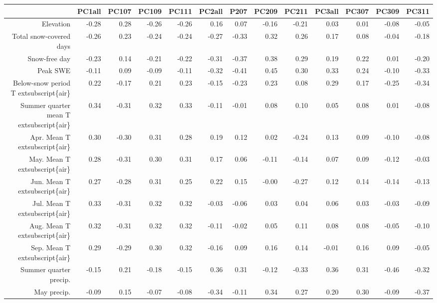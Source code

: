 \begin{table}[ht]
\centering
\begin{tabular}{rrrrrrrrrrrrr}
  \hline
 & PC1all & PC107 & PC109 & PC111 & PC2all & P207 & PC209 & PC211 & PC3all & PC307 & PC309 & PC311 \\ 
  \hline
Elevation & -0.28 & 0.28 & -0.26 & -0.26 & 0.16 & 0.07 & -0.16 & -0.21 & 0.03 & 0.01 & -0.08 & -0.05 \\ 
  Total snow-covered days & -0.26 & 0.23 & -0.24 & -0.24 & -0.27 & -0.33 & 0.32 & 0.26 & 0.17 & 0.08 & -0.04 & -0.18 \\ 
  Snow-free day & -0.23 & 0.14 & -0.21 & -0.22 & -0.31 & -0.37 & 0.38 & 0.29 & 0.19 & 0.22 & 0.01 & -0.20 \\ 
  Peak SWE & -0.11 & 0.09 & -0.09 & -0.11 & -0.32 & -0.41 & 0.45 & 0.30 & 0.33 & 0.24 & -0.10 & -0.33 \\ 
  Below-snow period T	extsubscript\{air\} & 0.22 & -0.17 & 0.21 & 0.23 & -0.15 & -0.23 & 0.23 & 0.08 & 0.29 & 0.17 & -0.25 & -0.34 \\ 
  Summer quarter mean T	extsubscript\{air\} & 0.34 & -0.31 & 0.32 & 0.33 & -0.11 & -0.01 & 0.08 & 0.10 & 0.05 & 0.08 & 0.01 & -0.08 \\ 
  Apr. Mean T	extsubscript\{air\} & 0.30 & -0.30 & 0.31 & 0.28 & 0.19 & 0.12 & 0.02 & -0.24 & 0.13 & 0.09 & -0.10 & -0.08 \\ 
  May. Mean T	extsubscript\{air\} & 0.28 & -0.31 & 0.30 & 0.31 & 0.17 & 0.06 & -0.11 & -0.14 & 0.07 & 0.09 & -0.12 & -0.03 \\ 
  Jun. Mean T	extsubscript\{air\} & 0.27 & -0.28 & 0.31 & 0.25 & 0.22 & 0.15 & -0.00 & -0.27 & 0.12 & 0.14 & -0.14 & -0.13 \\ 
  Jul. Mean T	extsubscript\{air\} & 0.33 & -0.31 & 0.32 & 0.32 & -0.03 & -0.06 & 0.03 & 0.04 & 0.06 & 0.03 & -0.03 & -0.09 \\ 
  Aug. Mean T	extsubscript\{air\} & 0.32 & -0.31 & 0.32 & 0.32 & -0.11 & -0.02 & 0.05 & 0.11 & 0.08 & 0.08 & -0.05 & -0.10 \\ 
  Sep. Mean T	extsubscript\{air\} & 0.29 & -0.29 & 0.30 & 0.32 & -0.16 & 0.09 & 0.16 & 0.14 & -0.01 & 0.16 & 0.09 & -0.05 \\ 
  Summer quarter precip. & -0.15 & 0.21 & -0.18 & -0.15 & 0.36 & 0.31 & -0.12 & -0.33 & 0.36 & 0.31 & -0.46 & -0.32 \\ 
  May precip. & -0.09 & 0.15 & -0.07 & -0.08 & -0.34 & -0.11 & 0.34 & 0.27 & 0.20 & 0.30 & -0.09 & -0.37 \\ 

\end{tabular}
\end{table}
